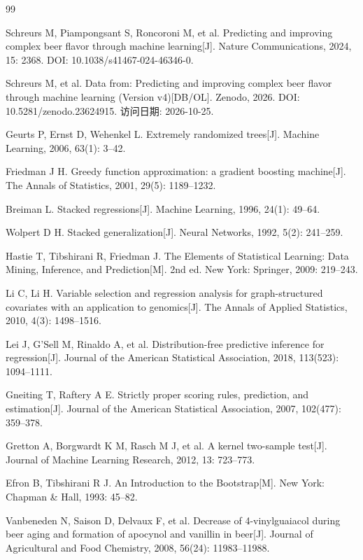 \begin{thebibliography}{99}
\footnotesize

 Schreurs M, Piampongsant S, Roncoroni M, et al. Predicting and improving complex beer flavor through machine learning[J]. Nature Communications, 2024, 15: 2368. DOI: 10.1038/s41467-024-46346-0.

 Schreurs M, et al. Data from: Predicting and improving complex beer flavor through machine learning (Version v4)[DB/OL]. Zenodo, 2026. DOI: 10.5281/zenodo.23624915. 访问日期: 2026-10-25.

 Geurts P, Ernst D, Wehenkel L. Extremely randomized trees[J]. Machine Learning, 2006, 63(1): 3--42.

 Friedman J H. Greedy function approximation: a gradient boosting machine[J]. The Annals of Statistics, 2001, 29(5): 1189--1232.

 Breiman L. Stacked regressions[J]. Machine Learning, 1996, 24(1): 49--64.

 Wolpert D H. Stacked generalization[J]. Neural Networks, 1992, 5(2): 241--259.

 Hastie T, Tibshirani R, Friedman J. The Elements of Statistical Learning: Data Mining, Inference, and Prediction[M]. 2nd ed. New York: Springer, 2009: 219--243.

 Li C, Li H. Variable selection and regression analysis for graph-structured covariates with an application to genomics[J]. The Annals of Applied Statistics, 2010, 4(3): 1498--1516.

 Lei J, G'Sell M, Rinaldo A, et al. Distribution-free predictive inference for regression[J]. Journal of the American Statistical Association, 2018, 113(523): 1094--1111.

 Gneiting T, Raftery A E. Strictly proper scoring rules, prediction, and estimation[J]. Journal of the American Statistical Association, 2007, 102(477): 359--378.

 Gretton A, Borgwardt K M, Rasch M J, et al. A kernel two-sample test[J]. Journal of Machine Learning Research, 2012, 13: 723--773.

 Efron B, Tibshirani R J. An Introduction to the Bootstrap[M]. New York: Chapman \& Hall, 1993: 45--82.

 Vanbeneden N, Saison D, Delvaux F, et al. Decrease of 4-vinylguaiacol during beer aging and formation of apocynol and vanillin in beer[J]. Journal of Agricultural and Food Chemistry, 2008, 56(24): 11983--11988.


\end{thebibliography}
